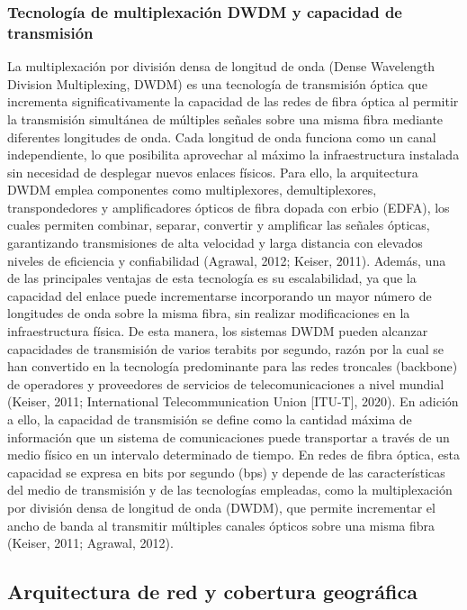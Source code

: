 \subsubsection{Tecnología de multiplexación DWDM y capacidad de transmisión}
La multiplexación por división densa de longitud de onda (Dense Wavelength Division Multiplexing, DWDM) es una tecnología de transmisión óptica que incrementa significativamente la capacidad de las redes de fibra óptica al permitir la transmisión simultánea de múltiples señales sobre una misma fibra mediante diferentes longitudes de onda. Cada longitud de onda funciona como un canal independiente, lo que posibilita aprovechar al máximo la infraestructura instalada sin necesidad de desplegar nuevos enlaces físicos. Para ello, la arquitectura DWDM emplea componentes como multiplexores, demultiplexores, transpondedores y amplificadores ópticos de fibra dopada con erbio (EDFA), los cuales permiten combinar, separar, convertir y amplificar las señales ópticas, garantizando transmisiones de alta velocidad y larga distancia con elevados niveles de eficiencia y confiabilidad (Agrawal, 2012; Keiser, 2011).
Además, una de las principales ventajas de esta tecnología es su escalabilidad, ya que la capacidad del enlace puede incrementarse incorporando un mayor número de longitudes de onda sobre la misma fibra, sin realizar modificaciones en la infraestructura física. De esta manera, los sistemas DWDM pueden alcanzar capacidades de transmisión de varios terabits por segundo, razón por la cual se han convertido en la tecnología predominante para las redes troncales (backbone) de operadores y proveedores de servicios de telecomunicaciones a nivel mundial (Keiser, 2011; International Telecommunication Union [ITU-T], 2020).
En adición a ello, la capacidad de transmisión se define como la cantidad máxima de información que un sistema de comunicaciones puede transportar a través de un medio físico en un intervalo determinado de tiempo. En redes de fibra óptica, esta capacidad se expresa en bits por segundo (bps) y depende de las características del medio de transmisión y de las tecnologías empleadas, como la multiplexación por división densa de longitud de onda (DWDM), que permite incrementar el ancho de banda al transmitir múltiples canales ópticos sobre una misma fibra (Keiser, 2011; Agrawal, 2012).
\subsection{Arquitectura de red y cobertura geográfica}
